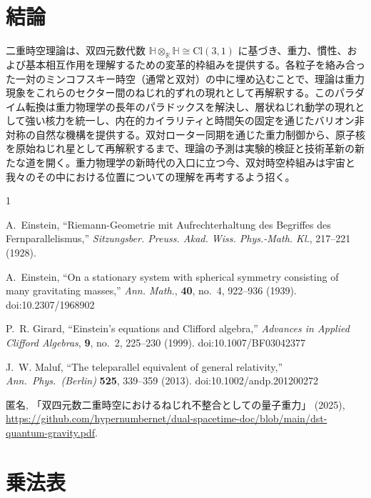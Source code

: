 \documentclass[a4paper]{article}
\begin{document}
\section{結論}
\label{sec:conclusions}
二重時空理論は、双四元数代数 $\mathbb{H} \otimes_{\mathbb{R}} \mathbb{H} \cong \mathrm{Cl}(3,1)$ に基づき、重力、慣性、および基本相互作用を理解するための変革的枠組みを提供する。各粒子を絡み合った一対のミンコフスキー時空（通常と双対）の中に埋め込むことで、理論は重力現象をこれらのセクター間のねじれ的ずれの現れとして再解釈する。このパラダイム転換は重力物理学の長年のパラドックスを解決し、層状ねじれ動学の現れとして強い核力を統一し、内在的カイラリティと時間矢の固定を通じたバリオン非対称の自然な機構を提供する。双対ローター同期を通じた重力制御から、原子核を原始ねじれ星として再解釈するまで、理論の予測は実験的検証と技術革新の新たな道を開く。重力物理学の新時代の入口に立つ今、双対時空枠組みは宇宙と我々のその中における位置についての理解を再考するよう招く。


\begin{thebibliography}{1}
\raggedright

A.~Einstein,
``Riemann-Geometrie mit Aufrechterhaltung des Begriffes des Fernparallelismus,''
\textit{Sitzungsber. Preuss. Akad. Wiss. Phys.-Math. Kl.},
217--221 (1928).

A.~Einstein,
``On a stationary system with spherical symmetry consisting of many gravitating masses,''
\textit{Ann. Math.},
\textbf{40}, no.~4, 922--936 (1939).
doi:10.2307/1968902

P.~R. Girard,
``Einstein’s equations and Clifford algebra,''
\textit{Advances in Applied Clifford Algebras},
\textbf{9}, no.~2, 225--230 (1999).
doi:10.1007/BF03042377

J.~W. Maluf,
``The teleparallel equivalent of general relativity,''
\textit{Ann.\ Phys.\ (Berlin)} \textbf{525}, 339--359 (2013).
doi:10.1002/andp.201200272

 匿名,
「双四元数二重時空におけるねじれ不整合としての量子重力」 (2025),
\url{https://github.com/hypernumbernet/dual-spacetime-doc/blob/main/dst-quantum-gravity.pdf}.

\end{thebibliography}

\clearpage
\appendix
\section{乗法表}
\label{app:mult-table}
\end{document}

